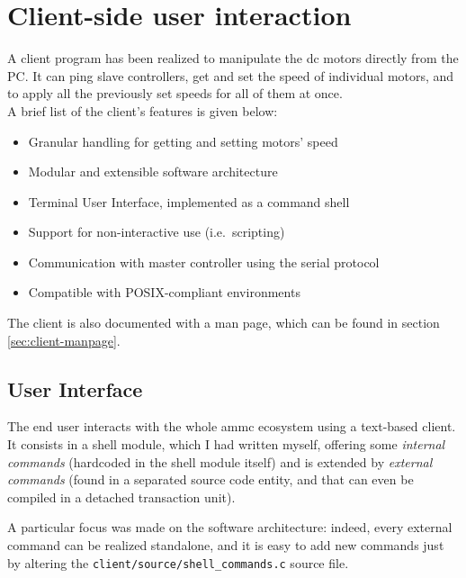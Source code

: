 \chapter{Client-side user interaction}
\label{ch:client}
A client program has been realized to manipulate the dc motors directly from
the PC. It can ping slave controllers, get and set the speed of individual
motors, and to apply all the previously set speeds for all of them at once.\\
A brief list of the client's features is given below:
\begin{itemize}
  \item Granular handling for getting and setting motors' speed
  \item Modular and extensible software architecture
  \item Terminal User Interface, implemented as a command shell
  \item Support for non-interactive use (i.e.\ scripting)
  \item Communication with master controller using the serial protocol
  \item Compatible with POSIX-compliant environments
\end{itemize}
The client is also documented with a man page, which can be found in section
\ref{sec:client-manpage}.

\section{User Interface}
The end user interacts with the whole ammc ecosystem using a text-based client.
It consists in a shell module, which I had written myself, offering some
\emph{internal commands} (hardcoded in the shell module itself) and is extended
by \emph{external commands} (found in a separated source code entity, and that
can even be compiled in a detached transaction unit).

A particular focus was made on the software architecture: indeed, every
external command can be realized standalone, and it is easy to add new
commands just by altering the \texttt{client/source/shell\_commands.c} source
file.

